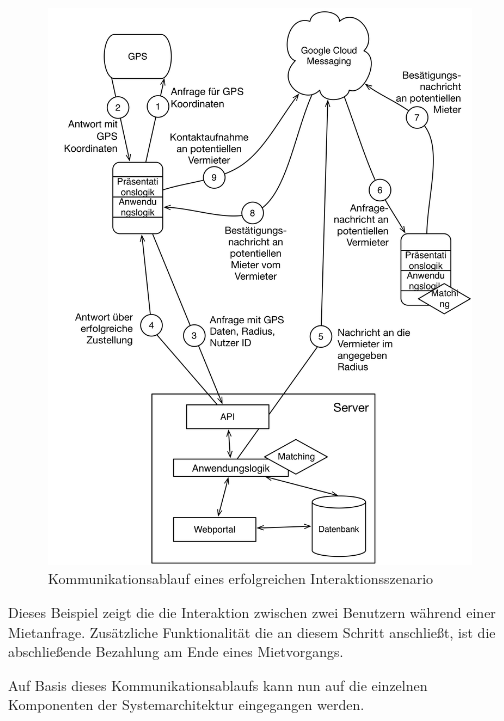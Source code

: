 \begin{figure}[H]
\includegraphics[width=.9\textwidth]{./images/kommunikationsablauf.png}
\caption{Kommunikationsablauf eines erfolgreichen Interaktionsszenario }
\label{fig:kommunikationsablauf}
\end{figure}

Dieses Beispiel zeigt die die Interaktion zwischen zwei Benutzern während einer Mietanfrage. Zusätzliche Funktionalität die an diesem Schritt anschließt, ist die abschließende Bezahlung am Ende eines Mietvorgangs.

Auf Basis dieses Kommunikationsablaufs kann nun auf die einzelnen Komponenten der Systemarchitektur eingegangen werden.

